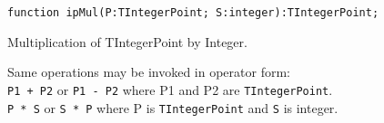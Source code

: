 \documentclass[12pt,a4paper,oneside]{article}
\newcommand{\code}[1]{\texttt{#1}}
\begin{document}
\begin{verbatim}
function ipMul(P:TIntegerPoint; S:integer):TIntegerPoint;
\end{verbatim}\vspace{-6pt}
Multiplication of TIntegerPoint by Integer.

\noindent Same operations may be invoked in operator form:\\
\code{P1 + P2} or \code{P1 - P2} where P1 and P2 are \code{TIntegerPoint}.\\
\code{P * S} or \code{S * P} where P is \code{TIntegerPoint} and \code{S} is integer.

\end{document}

